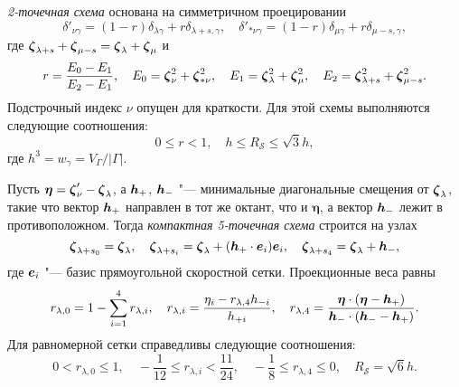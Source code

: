 \emph{2-точечная схема} основана на симметричном проецировании
\begin{equation}\label{eq:uniform_projection}
    \delta'_{\nu\gamma} = (1-r)\delta_{\lambda\gamma} + r\delta_{\lambda+s,\gamma}, \quad
    \delta'_{*\nu\gamma} = (1-r)\delta_{\mu\gamma} + r\delta_{\mu-s,\gamma},
\end{equation}
где \({\boldsymbol{\zeta}}_{\lambda+s} + {\boldsymbol{\zeta}}_{\mu-s} = {\boldsymbol{\zeta}}_{\lambda} + {\boldsymbol{\zeta}}_{\mu}\) и
\begin{equation}\label{eq:stencil_weights2}
    r = \frac{E_0-E_1}{E_2-E_1}, \quad
    E_0 = {\boldsymbol{\zeta}}_{\nu}^2 + {\boldsymbol{\zeta}}_{*\nu}^2, \quad
    E_1 = {\boldsymbol{\zeta}}_{\lambda}^2 + {\boldsymbol{\zeta}}_{\mu}^2, \quad
    E_2 = {\boldsymbol{\zeta}}_{\lambda+s}^2 + {\boldsymbol{\zeta}}_{\mu-s}^2.
\end{equation}
Подстрочный индекс \(\nu\) опущен для краткости.
Для этой схемы выполняются следующие соотношения:
\begin{equation}\label{eq:weights_ranges2}
    0 \leq r < 1, \quad h \leq R_{\mathcal{S}} \leq \sqrt3h,
\end{equation}
где \(h^3 = w_\gamma = V_\Gamma/|\Gamma|\).

Пусть \(\boldsymbol{\eta} = {\boldsymbol{\zeta}}'_{\nu} - {\boldsymbol{\zeta}}_{\lambda}\),
а \({\boldsymbol{h}}_+\), \({\boldsymbol{h}}_-\) "--- минимальные диагональные смещения от \({\boldsymbol{\zeta}}_{\lambda}\),
такие что вектор \({\boldsymbol{h}}_+\) направлен в тот же октант, что и \(\boldsymbol{\eta}\),
а вектор \({\boldsymbol{h}}_-\) лежит в противоположном.
Тогда \emph{компактная 5-точечная схема} строится на узлах
\begin{equation}\label{eq:stencil_nodes5}
    {\boldsymbol{\zeta}}_{\lambda+s_0} = {\boldsymbol{\zeta}}_{\lambda}, \quad
    {\boldsymbol{\zeta}}_{\lambda+s_i} = {\boldsymbol{\zeta}}_{\lambda} + ({\boldsymbol{h}}_+\cdot \boldsymbol{e}_i)\boldsymbol{e}_i, \quad
    {\boldsymbol{\zeta}}_{\lambda+s_4} = {\boldsymbol{\zeta}}_{\lambda} + {\boldsymbol{h}}_-,
\end{equation}
где \(\boldsymbol{e}_i\) "--- базис прямоугольной скоростной сетки. Проекционные веса равны
\begin{equation}\label{eq:stencil_weights5}
    r_{\lambda,0} = 1 - \sum_{i=1}^4 r_{\lambda,i}, \quad
    r_{\lambda,i} = \frac{\eta_i - r_{\lambda,4}h_{-i}}{h_{+i}}, \quad
    r_{\lambda,4} = \frac{\boldsymbol{\eta}\cdot(\boldsymbol{\eta} - {\boldsymbol{h}}_+)}
        {{\boldsymbol{h}}_-\cdot({\boldsymbol{h}}_- - {\boldsymbol{h}}_+)}.
\end{equation}
Для равномерной сетки справедливы следующие соотношения:
\begin{equation}\label{eq:weights_ranges5}
    0 < r_{\lambda,0} \leq 1, \quad
    -\frac1{12} \leq r_{\lambda,i} < \frac{11}{24}, \quad
    -\frac18 \leq r_{\lambda,4} \leq 0, \quad
    R_\mathcal{S} = \sqrt6h.
\end{equation}

